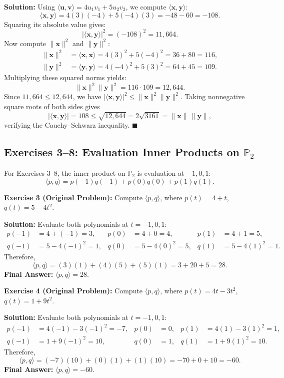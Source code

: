 \documentclass[11pt, letterpaper]{article}
\theoremstyle{definition}
\theoremstyle{remark}
\begin{document}
\textbf{Solution:}
Using $\langle \mathbf{u}, \mathbf{v} \rangle = 4u_1 v_1 + 5u_2 v_2$, we compute $\langle \mathbf{x}, \mathbf{y} \rangle$:
\[
    \langle \mathbf{x}, \mathbf{y} \rangle = 4(3)(-4) + 5(-4)(3) = -48 - 60 = -108.
\]
Squaring its absolute value gives:
\[
    |\langle \mathbf{x}, \mathbf{y} \rangle|^2 = (-108)^2 = 11{,}664.
\]
Now compute $\|\mathbf{x}\|^2$ and $\|\mathbf{y}\|^2$:
\begin{align*}
    \|\mathbf{x}\|^2 &= \langle \mathbf{x}, \mathbf{x} \rangle = 4(3)^2 + 5(-4)^2 = 36 + 80 = 116, \\
    \|\mathbf{y}\|^2 &= \langle \mathbf{y}, \mathbf{y} \rangle = 4(-4)^2 + 5(3)^2 = 64 + 45 = 109.
\end{align*}
Multiplying these squared norms yields:
\[
    \|\mathbf{x}\|^2 \|\mathbf{y}\|^2 = 116 \cdot 109 = 12{,}644.
\]
Since $11{,}664 \le 12{,}644$, we have $|\langle \mathbf{x}, \mathbf{y} \rangle|^2 \le \|\mathbf{x}\|^2 \|\mathbf{y}\|^2$. Taking nonnegative square roots of both sides gives
\[
    |\langle \mathbf{x}, \mathbf{y} \rangle| = 108 \le \sqrt{12{,}644} = 2\sqrt{3161} = \|\mathbf{x}\|\,\|\mathbf{y}\|,
\]
verifying the Cauchy--Schwarz inequality. \hfill $\blacksquare$

\subsection{Exercises 3--8: Evaluation Inner Products on $\mathbb{P}_2$}

For Exercises 3--8, the inner product on $\mathbb{P}_2$ is evaluation at $-1, 0, 1$:
\[
    \langle p, q \rangle = p(-1)q(-1) + p(0)q(0) + p(1)q(1).
\]

\textbf{Exercise 3 (Original Problem):} Compute $\langle p, q \rangle$, where $p(t) = 4 + t$, $q(t) = 5 - 4t^2$.

\textbf{Solution:}
Evaluate both polynomials at $t = -1, 0, 1$:
\begin{align*}
    p(-1) &= 4 + (-1) = 3, & p(0) &= 4 + 0 = 4, & p(1) &= 4 + 1 = 5, \\
    q(-1) &= 5 - 4(-1)^2 = 1, & q(0) &= 5 - 4(0)^2 = 5, & q(1) &= 5 - 4(1)^2 = 1.
\end{align*}
Therefore,
\[
    \langle p, q \rangle = (3)(1) + (4)(5) + (5)(1) = 3 + 20 + 5 = 28.
\]
\textbf{Final Answer:} $\langle p, q \rangle = 28$.

\textbf{Exercise 4 (Original Problem):} Compute $\langle p, q \rangle$, where $p(t) = 4t - 3t^2$, $q(t) = 1 + 9t^2$.

\textbf{Solution:}
Evaluate both polynomials at $t = -1, 0, 1$:
\begin{align*}
    p(-1) &= 4(-1) - 3(-1)^2 = -7, & p(0) &= 0, & p(1) &= 4(1) - 3(1)^2 = 1, \\
    q(-1) &= 1 + 9(-1)^2 = 10, & q(0) &= 1, & q(1) &= 1 + 9(1)^2 = 10.
\end{align*}
Therefore,
\[
    \langle p, q \rangle = (-7)(10) + (0)(1) + (1)(10) = -70 + 0 + 10 = -60.
\]
\textbf{Final Answer:} $\langle p, q \rangle = -60$.
\end{document}
